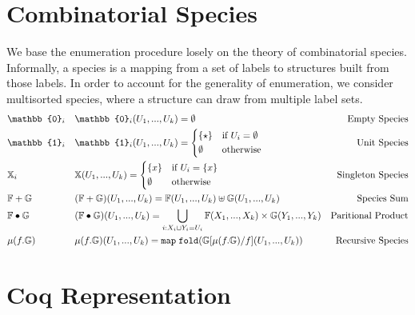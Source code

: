 \documentclass[11pt]{article}
\newcommand{\irl}[1]{\mathtt{#1}}
\begin{document}
\section{Combinatorial Species}

We base the enumeration procedure losely on the theory of combinatorial species. Informally, a species
is a mapping from a set of labels to structures built from those labels. In order to account for the 
generality of enumeration, we consider multisorted species, where a structure can draw from multiple label sets.\\

\begin{align*}
&\mathbb{0}_i &&\mathbb{0}_i(U_1,...,U_k) = \emptyset  &\text{Empty Species}\\
&\mathbb{1}_i &&\mathbb{1}_i(U_1,...,U_k) =
		\begin{cases*}
      \{\star\} & if $U_i = \emptyset$\\
      \emptyset        & otherwise
    \end{cases*} & \text{Unit Species}\\
&\mathbb{X}_i && \mathbb{X}(U_1,...,U_k) = 
		\begin{cases*}
      \{x\} & if $U_i = \{x\}$\\
      \emptyset        & otherwise
    \end{cases*} & \text{Singleton Species}\\
&\mathbb{F} + \mathbb{G} && (\mathbb{F} + \mathbb{G})(U_1,...,U_k) = 
	\mathbb{F}(U_1,...,U_k) \uplus \mathbb{G}(U_1,...,U_k) & \text{Species Sum}\\
&\mathbb{F} \bullet \mathbb{G} && (\mathbb{F} \bullet \mathbb{G})(U_1,...,U_k) = 
	\bigcup_{i : X_i \sqcup Y_i = U_i}	\mathbb{F}(X_1,...,X_k) \times \mathbb{G}(Y_1,...,Y_k) &
\text{Paritional Product}\\
&\mu(f.\mathbb{G}) && \mu(f.\mathbb{G})(U_1,...,U_k) = \irl{map}\; \irl{fold} (\mathbb{G}[\mu(f.\mathbb{G})/f](U_1,...,U_k)) &
\text{Recursive Species}
\end{align*}

\section{Coq Representation}
\end{document}
